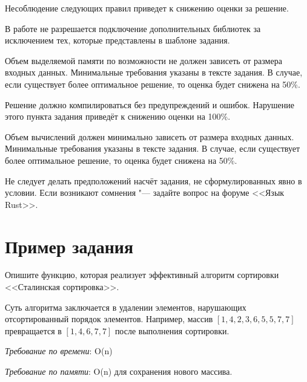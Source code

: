\documentclass[a4paper, 10pt]{extarticle}
\begin{document}
Несоблюдение следующих правил приведет к снижению оценки за решение.

\begin{importantblock}
    В работе не разрешается подключение дополнительных библиотек за исключением тех, которые представлены в шаблоне задания.
\end{importantblock}

\begin{importantblock}
    Объем выделяемой памяти по возможности не должен зависеть от размера входных данных. Минимальные требования указаны в тексте задания. В случае, если существует более оптимальное решение, то оценка будет снижена на 50\%.
\end{importantblock}

\begin{importantblock}
    Решение должно компилироваться без предупреждений и ошибок. Нарушение этого пункта задания приведёт к снижению оценки на 100\%.
    \end{importantblock}

\begin{importantblock}
    Объем вычислений должен минимально зависеть от размера входных данных. Минимальные требования указаны в тексте задания. В случае, если существует более оптимальное решение, то оценка будет снижена на 50\%.
\end{importantblock}

\begin{importantblock}
Не следует делать предположений насчёт задания, не сформулированных явно в условии. Если возникают сомнения "--- задайте вопрос на форуме <<Язык Rust>>.
\end{importantblock}


\section{Пример задания}

\begin{tsk}
    Опишите функцию, которая реализует эффективный алгоритм сортировки <<Сталинская сортировка>>. 
    
    Суть алгоритма заключается в удалении элементов, нарушающих отсортированный порядок элементов. Например, массив $[1,4,2,3,6,5,5,7,7]$
    превращается в $[1,4,6,7,7]$
    после выполнения сортировки.

    \textit{Требование по времени}: O(n)

    \textit{Требование по памяти}: O(n) для сохранения нового массива.
\end{tsk}
\end{document}
